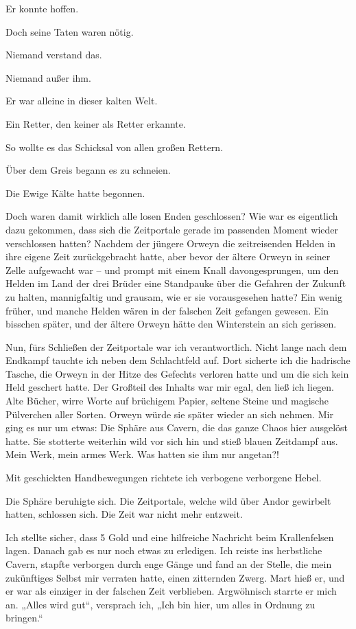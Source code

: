 Er konnte hoffen.

Doch seine Taten waren nötig.

Niemand verstand das.

Niemand außer ihm.

Er war alleine in dieser kalten Welt.

Ein Retter, den keiner als Retter erkannte.

So wollte es das Schicksal von allen großen Rettern. 

Über dem Greis begann es zu schneien.

Die Ewige Kälte hatte begonnen.


Doch waren damit wirklich alle losen Enden geschlossen? Wie war es eigentlich dazu gekommen, dass sich die Zeitportale gerade im passenden Moment wieder verschlossen hatten? Nachdem der jüngere Orweyn die zeitreisenden Helden in ihre eigene Zeit zurückgebracht hatte, aber bevor der ältere Orweyn in seiner Zelle aufgewacht war – und prompt mit einem Knall davongesprungen, um den Helden im Land der drei Brüder eine Standpauke über die Gefahren der Zukunft zu halten, mannigfaltig und grausam, wie er sie vorausgesehen hatte? Ein wenig früher, und manche Helden wären in der falschen Zeit gefangen gewesen. Ein bisschen später, und der ältere Orweyn hätte den Winterstein an sich gerissen.

Nun, fürs Schließen der Zeitportale war ich verantwortlich. Nicht lange nach dem Endkampf tauchte ich neben dem Schlachtfeld auf. Dort sicherte ich die hadrische Tasche, die Orweyn in der Hitze des Gefechts verloren hatte und um die sich kein Held geschert hatte. Der Großteil des Inhalts war mir egal, den ließ ich liegen. Alte Bücher, wirre Worte auf brüchigem Papier, seltene Steine und magische Pülverchen aller Sorten. Orweyn würde sie später wieder an sich nehmen. Mir ging es nur um etwas: Die Sphäre aus Cavern, die das ganze Chaos hier ausgelöst hatte. Sie stotterte weiterhin wild vor sich hin und stieß blauen Zeitdampf aus. Mein Werk, mein armes Werk. Was hatten sie ihm nur angetan?! 

Mit geschickten Handbewegungen richtete ich verbogene verborgene Hebel.
 
Die Sphäre beruhigte sich. Die Zeitportale, welche wild über Andor gewirbelt hatten, schlossen sich. Die Zeit war nicht mehr entzweit.

Ich stellte sicher, dass 5 Gold und eine hilfreiche Nachricht beim Krallenfelsen lagen. Danach gab es nur noch etwas zu erledigen. Ich reiste ins herbstliche Cavern, stapfte verborgen durch enge Gänge und fand an der Stelle, die mein zukünftiges Selbst mir verraten hatte, einen zitternden Zwerg. Mart hieß er, und er war als einziger in der falschen Zeit verblieben. Argwöhnisch starrte er mich an. „Alles wird gut“, versprach ich, „Ich bin hier, um alles in Ordnung zu bringen.“ 

